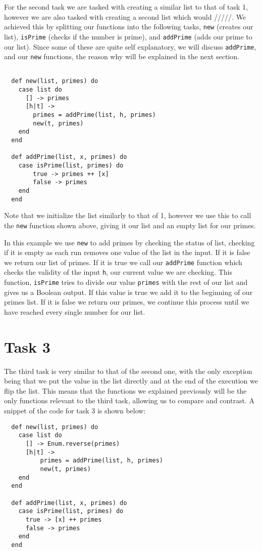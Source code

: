 \documentclass[a4paper,11pt]{article}
\begin{document}
For the second task we are tasked with creating a similar list to that of task 1, however we are also tasked with creating a second list which would /////. We achieved this by splitting our functions into the following tasks, {\tt new} (creates our list), {\tt isPrime} (checks if the number is prime), and {\tt addPrime} (adds our prime to our list). Since some of these are quite self explanatory, we will discuss {\tt addPrime}, and our {\tt new} functions, the reason why will be explained in the next section.

\begin{verbatim}

  def new(list, primes) do
    case list do
      [] -> primes
      [h|t] ->
        primes = addPrime(list, h, primes)
        new(t, primes)
    end
  end

  def addPrime(list, x, primes) do
    case isPrime(list, primes) do
        true -> primes ++ [x]
        false -> primes
    end
  end
\end{verbatim}

Note that we initialize the list similarly to that of 1, however we use this to call the {\tt new} function shown above, giving it our list and an empty list for our primes.

In this example we use {\tt new} to add primes by checking the status of list, checking if it is empty as each run removes one value of the list in the input. If it is false we return our list of primes. If it is true we call our {\tt addPrime} function which checks the validity of the input {\tt h}, our current value we are checking. This function, {\tt isPrime} tries to divide our value {\tt primes} with the rest of our list and gives us a Boolean output. If this value is true we add it to the beginning of our primes list. If it is false we return our primes, we continue this process until we have reached every single number for our list.

\section*{Task 3}
The third task is very similar to that of the second one, with the only exception being that we put the value in the list directly and at the end of the execution we flip the list. This means that the functions we explained previously will be the only functions relevant to the third task, allowing us to compare and contrast. A snippet of the code for task 3 is shown below:

\begin{verbatim}
  def new(list, primes) do
    case list do
      [] -> Enum.reverse(primes)
      [h|t] ->
          primes = addPrime(list, h, primes)
          new(t, primes)
    end
  end

  def addPrime(list, x, primes) do
    case isPrime(list, primes) do
      true -> [x] ++ primes
      false -> primes
    end
  end
\end{verbatim}
\end{document}
